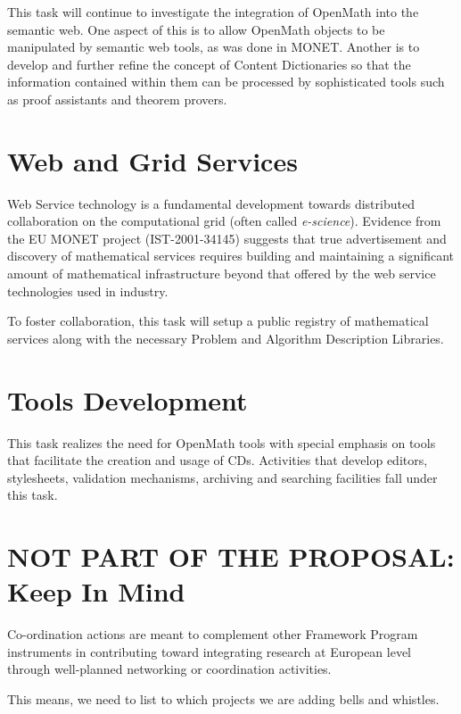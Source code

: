 \documentclass[draft]{artikel3}
\begin{document}
This task will continue to investigate the integration of OpenMath
into the semantic web.  One aspect of this is to allow OpenMath
objects to be manipulated by semantic web tools, as was done in MONET.
Another is to develop and further refine the concept of Content
Dictionaries so that the information contained within them can be
processed by sophisticated tools such as proof assistants and theorem
provers.

\section{Web and Grid Services}



Web Service technology is a fundamental development towards
distributed collaboration on the computational grid (often called
\emph{e-science}).  Evidence from the EU MONET project
(IST-2001-34145) suggests that true advertisement and discovery of
mathematical services requires building and maintaining a significant
amount of mathematical infrastructure beyond that offered by the web
service technologies used in industry.

To foster collaboration, this task will setup a public registry of
mathematical services along with the necessary Problem and Algorithm
Description Libraries.

\section{Tools Development} 
\label{tools}

This task realizes the need for OpenMath tools with special emphasis
on tools that facilitate the creation and usage of CDs. Activities
that develop editors, stylesheets, validation mechanisms, archiving
and searching facilities fall under this task.




\newpage
\setcounter{tocdepth}{2}\tableofcontents

\section{NOT PART OF THE PROPOSAL:  Keep In Mind}
Co-ordination actions are meant to complement other Framework
Program instruments in contributing toward integrating research at
European level through well-planned networking or coordination
activities.

This means, we need to list to which projects we are adding bells and
whistles.
\end{document}
